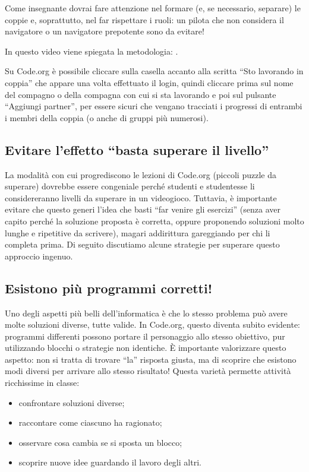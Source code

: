 Come insegnante dovrai fare attenzione nel formare (e, se necessario, separare) le coppie e, soprattutto, nel far rispettare i ruoli: un pilota che non considera il navigatore o un navigatore prepotente sono da evitare!

In questo video viene spiegata la metodologia: .

Su Code.org è possibile cliccare sulla casella accanto alla scritta ``Sto lavorando in coppia'' che appare una volta effettuato il login, quindi cliccare prima sul nome del compagno o della compagna con cui si sta lavorando e poi sul pulsante ``Aggiungi partner'', per essere sicuri che vengano tracciati i progressi di entrambi i membri della coppia (o anche di gruppi più numerosi).

\subsection{Evitare l'effetto ``basta superare il livello'' }\label{evitare-leffetto-basta-superare-il-livello}

La modalità con cui progrediscono le lezioni di Code.org (piccoli puzzle da superare) dovrebbe essere congeniale perché studenti e studentesse li considereranno livelli da superare in un videogioco. Tuttavia, è importante evitare che questo generi l'idea che basti ``far venire gli esercizi'' (senza aver capito perché la soluzione proposta è corretta, oppure proponendo soluzioni molto lunghe e ripetitive da scrivere), magari addirittura gareggiando per chi li completa prima. Di seguito discutiamo alcune strategie per superare questo approccio ingenuo.


\subsection{Esistono più programmi corretti!}


Uno degli aspetti più belli dell'informatica è che lo stesso problema può avere molte soluzioni diverse, tutte valide. In Code.org, questo diventa subito evidente: programmi differenti possono portare il personaggio allo stesso obiettivo, pur utilizzando blocchi o strategie non identiche. È importante valorizzare questo aspetto: non si tratta di trovare ``la'' risposta giusta, ma di scoprire che esistono modi diversi per arrivare allo stesso risultato! Questa varietà permette attività ricchissime in classe:

\begin{itemize}
\item
  confrontare soluzioni diverse;
\item
  raccontare come ciascuno ha ragionato;
\item
  osservare cosa cambia se si sposta un blocco;
\item
  scoprire nuove idee guardando il lavoro degli altri.
\end{itemize}

